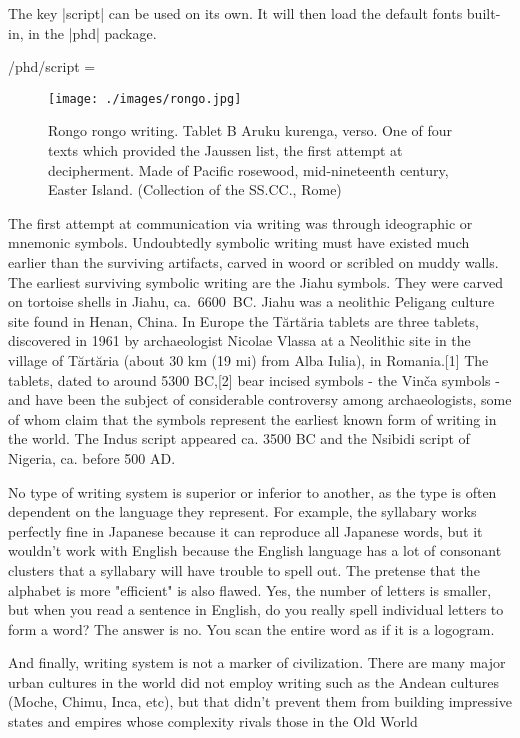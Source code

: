 The key |script| can be used on its own. It will then load the default fonts built-in, in the |phd| package.


\begin{key}{/phd/script = }
\end{key}

\begin{figure}[b]
\centering
\texttt{[image: ./images/rongo.jpg]}
\caption{Rongo rongo writing. Tablet B Aruku kurenga, verso. One of four texts which provided the Jaussen list, the first attempt at decipherment. Made of Pacific rosewood, mid-nineteenth century, Easter Island.
(Collection of the SS.CC., Rome)}
\end{figure}

The first attempt  at communication via writing was through ideographic or mnemonic symbols. Undoubtedly symbolic writing must have existed much earlier than the surviving artifacts, carved in woord or scribled on muddy walls. The earliest surviving symbolic writing are the Jiahu symbols. They were carved on tortoise shells in Jiahu, ca.~6600~BC. Jiahu was a neolithic Peligang culture site found in Henan, China. In Europe the Tărtăria tablets are three tablets, discovered in 1961 by archaeologist Nicolae Vlassa at a Neolithic site in the village of Tărtăria (about 30 km (19 mi) from Alba Iulia), in Romania.[1] The tablets, dated to around 5300 BC,[2] bear incised symbols - the Vinča symbols - and have been the subject of considerable controversy among archaeologists, some of whom claim that the symbols represent the earliest known form of writing in the world. The Indus script appeared ca. 3500 BC and the Nsibidi script of Nigeria, ca. before 500 AD. 

No type of writing system is superior or inferior to another, as the type is often dependent on the language they represent. For example, the syllabary works perfectly fine in Japanese because it can reproduce all Japanese words, but it wouldn't work with English because the English language has a lot of consonant clusters that a syllabary will have trouble to spell out. The pretense that the alphabet is more "efficient" is also flawed. Yes, the number of letters is smaller, but when you read a sentence in English, do you really spell individual letters to form a word? The answer is no. You scan the entire word as if it is a logogram.

And finally, writing system is not a marker of civilization. There are many major urban cultures in the world did not employ writing such as the Andean cultures (Moche, Chimu, Inca, etc), but that didn't prevent them from building impressive states and empires whose complexity rivals those in the Old World

